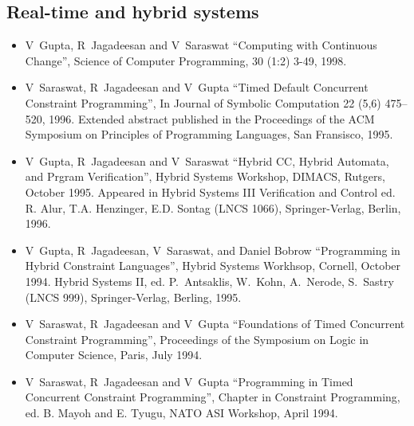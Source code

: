 \documentclass{article}
\begin{document}
\subsection*{Real-time and hybrid systems}
\begin{itemize} 
\item  V~Gupta, R~Jagadeesan and V~Saraswat
  ``Computing with Continuous Change'',  Science of
  Computer Programming, 30 (1:2) 3-49, 1998.

\item  V~Saraswat, R~Jagadeesan and V~Gupta
  ``Timed Default Concurrent Constraint Programming'', In Journal of
  Symbolic Computation 22 (5,6) 475--520, 1996. Extended abstract
  published in the Proceedings of the ACM Symposium on Principles of
  Programming Languages, San Fransisco, 1995.
  
\item  V~Gupta, R~Jagadeesan and V~Saraswat
  ``Hybrid CC, Hybrid Automata, and Prgram Verification'', Hybrid
  Systems Workshop, DIMACS, Rutgers, October 1995. Appeared in Hybrid
  Systems III Verification and Control ed.{} R. Alur, T.A.{}
  Henzinger, E.D.{} Sontag (LNCS 1066), Springer-Verlag, Berlin, 1996.

\item  V~Gupta, R~Jagadeesan, V~Saraswat, and Daniel
  Bobrow ``Programming in Hybrid Constraint Languages'', Hybrid
  Systems Workhsop, Cornell, October 1994. Hybrid Systems II, ed.{}
  P.~Antsaklis, W.~Kohn, A.~Nerode, S.~Sastry (LNCS 999),
  Springer-Verlag, Berling, 1995.

\item  V~Saraswat, R~Jagadeesan and V~Gupta
  ``Foundations of Timed Concurrent Constraint Programming'',
  Proceedings of the Symposium on Logic in Computer Science, Paris,
  July 1994.
  
\item  V~Saraswat, R~Jagadeesan and V~Gupta
  ``Programming in Timed Concurrent Constraint Programming'',
  Chapter in Constraint Programming, ed.{} B. Mayoh and E. Tyugu,
  NATO ASI Workshop, April 1994.
\end{itemize}
\end{document}
